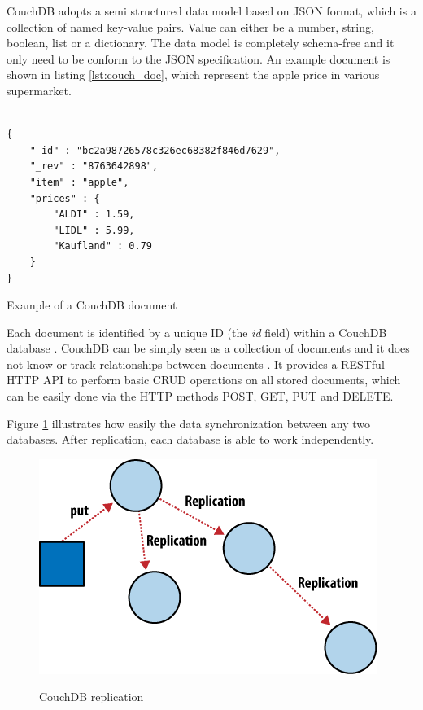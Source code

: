 CouchDB adopts a semi structured data model based on \ac{JSON} format, which is a collection of named key-value pairs. Value can either be a number, string, boolean, list or a dictionary. The data model is completely schema-free and it only need to be conform to the \ac{JSON} specification. An example document is shown in listing \ref{lst:couch_doc}, which represent the apple price in various supermarket. 
\\
\\
\begin{code}
\begin{verbatim}
{
    "_id" : "bc2a98726578c326ec68382f846d7629",
    "_rev" : "8763642898",
    "item" : "apple",
    "prices" : {
        "ALDI" : 1.59,
        "LIDL" : 5.99,
        "Kaufland" : 0.79
    }
}
\end{verbatim}
\caption{Example of a CouchDB document}
\label{lst:couch_doc}
\end{code}

Each document is identified by a unique ID (the \textit{id} field) within a CouchDB database . CouchDB can be simply seen as a collection of documents and it does not know or track relationships between documents \cite{books/daglib/0024051}.  It provides a RESTful \ac{HTTP} \ac{API} to perform basic CRUD operations on all stored documents, which can be easily done via the \ac{HTTP} methods POST, GET, PUT and DELETE.

Figure \ref{fig:couchdb_repl} illustrates how easily the data synchronization between any two databases. After replication, each database is able to work independently.

\begin{figure}[htb]
  \centering
  \includegraphics{couchdb_repl.png}\\
  \caption{CouchDB replication}
  \label{fig:couchdb_repl}
  \protect\cite{couchdb_cons}
\end{figure}

